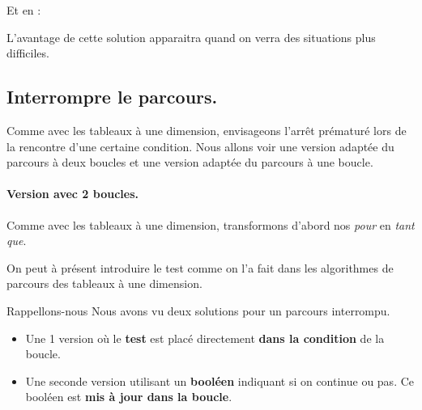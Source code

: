 			Et en  : 

			L'avantage de cette solution apparaitra 
			quand on verra des situations plus difficiles.

		\subsection{Interrompre le parcours.}
			
			Comme avec les tableaux à une dimension, 
			envisageons l'arrêt prématuré lors de la rencontre d'une certaine condition.
			Nous allons voir une version adaptée du parcours à deux boucles
			et une version adaptée du parcours à une boucle.
			
			\paragraph*{Version avec 2 boucles.}

			Comme avec les tableaux à une dimension, 
			transformons d'abord nos \emph{pour} en \emph{tant que}.

			\begin{algo}
				\;
			\end{algo}
			
			On peut à présent introduire le test comme on l'a fait 
			dans les algorithmes de parcours des tableaux à une dimension.

			\medskip
			\begin{infotbox}{Rappellons-nous}
				Nous avons vu deux solutions pour un parcours interrompu.
				\begin{itemize}
				\item 
					Une 1\iere{} version où le \textbf{test} est placé directement 
					\textbf{dans la condition} de la boucle.
				\item 
					Une seconde version utilisant un \textbf{booléen} 
					indiquant si on continue ou pas. 
					Ce booléen est \textbf{mis à jour dans la boucle}.
				\end{itemize}
			\end{infotbox}
			\medskip

